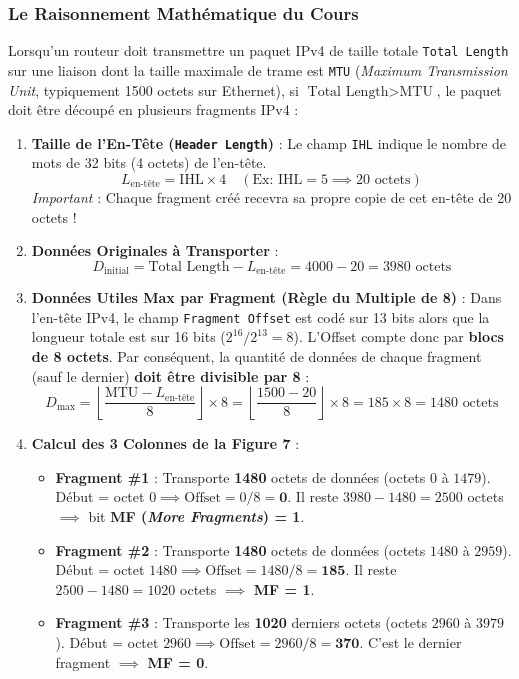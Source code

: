 \documentclass[11pt,a4paper]{article}
\begin{document}
\subsubsection{Le Raisonnement Mathématique du Cours}
Lorsqu'un routeur doit transmettre un paquet IPv4 de taille totale \texttt{Total Length} sur une liaison dont la taille maximale de trame est \texttt{MTU} (\textit{Maximum Transmission Unit}, typiquement 1500 octets sur Ethernet), si $\text{Total Length} > \text{MTU}$, le paquet doit être découpé en plusieurs fragments IPv4 :
\begin{enumerate}
    \item \textbf{Taille de l'En-Tête (\texttt{Header Length})} : Le champ \texttt{IHL} indique le nombre de mots de 32 bits (4 octets) de l'en-tête.
    $$L_{\text{en-tête}} = \text{IHL} \times 4 \quad (\text{Ex: } \text{IHL}=5 \implies 20\text{ octets})$$
    \textit{Important} : Chaque fragment créé recevra sa propre copie de cet en-tête de 20 octets !
    \item \textbf{Données Originales à Transporter} :
    $$D_{\text{initial}} = \text{Total Length} - L_{\text{en-tête}} = 4000 - 20 = 3980\text{ octets}$$
    \item \textbf{Données Utiles Max par Fragment (Règle du Multiple de 8)} :
    Dans l'en-tête IPv4, le champ \texttt{Fragment Offset} est codé sur 13 bits alors que la longueur totale est sur 16 bits ($2^{16} / 2^{13} = 8$). L'Offset compte donc par \textbf{blocs de 8 octets}. Par conséquent, la quantité de données de chaque fragment (sauf le dernier) \textbf{doit être divisible par 8} :
    $$D_{\max} = \left\lfloor \frac{\text{MTU} - L_{\text{en-tête}}}{8} \right\rfloor \times 8 = \left\lfloor \frac{1500 - 20}{8} \right\rfloor \times 8 = 185 \times 8 = 1480\text{ octets}$$
    \item \textbf{Calcul des 3 Colonnes de la Figure 7} :
    \begin{itemize}
        \item \textbf{Fragment \#1} : Transporte \textbf{1480} octets de données (octets $0$ à $1479$). Début = octet $0 \implies \text{Offset} = 0 / 8 = \mathbf{0}$. Il reste $3980 - 1480 = 2500$ octets $\implies$ bit \textbf{MF (\textit{More Fragments}) = 1}.
        \item \textbf{Fragment \#2} : Transporte \textbf{1480} octets de données (octets $1480$ à $2959$). Début = octet $1480 \implies \text{Offset} = 1480 / 8 = \mathbf{185}$. Il reste $2500 - 1480 = 1020$ octets $\implies$ \textbf{MF = 1}.
        \item \textbf{Fragment \#3} : Transporte les \textbf{1020} derniers octets (octets $2960$ à $3979$). Début = octet $2960 \implies \text{Offset} = 2960 / 8 = \mathbf{370}$. C'est le dernier fragment $\implies$ \textbf{MF = 0}.
    \end{itemize}
\end{enumerate}
\end{document}
